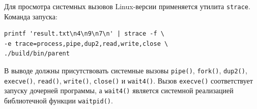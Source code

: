 Для просмотра системных вызовов Linux-версии применяется утилита
\texttt{strace}. Команда запуска:

\begin{lstlisting}[language={}]
printf 'result.txt\n4\n9\n7\n' | strace -f \
-e trace=process,pipe,dup2,read,write,close \
./build/bin/parent
\end{lstlisting}

В выводе должны присутствовать системные вызовы \texttt{pipe()},
\texttt{fork()}, \texttt{dup2()}, \texttt{execve()}, \texttt{read()},
\texttt{write()}, \texttt{close()} и \texttt{wait4()}. Вызов
\texttt{execve()} соответствует запуску дочерней программы, а
\texttt{wait4()} является системной реализацией библиотечной функции
\texttt{waitpid()}.